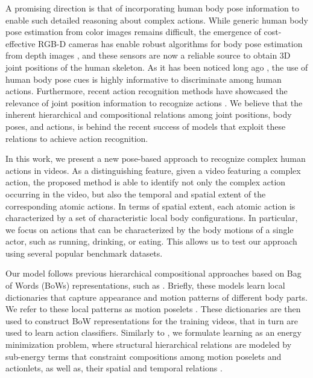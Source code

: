 A promising direction is that of incorporating human body pose information
to enable such detailed reasoning about complex actions.
While generic human body pose estimation from color images remains difficult,
the emergence of cost-effective RGB-D cameras has enable robust
algorithms for body pose estimation from depth images
\cite{Shotton:EtAl:11}, and these sensors are now
a reliable source to obtain 3D joint positions of the human skeleton. 
As it has been noticed long ago \cite{Johansson:1973}, the use of human body
pose cues is highly informative to discriminate among human actions.
Furthermore, recent action recognition methods have
showcased the relevance of joint position information to 
recognize actions \cite{Jhuang2013,Wang2013}. We believe that the 
inherent
hierarchical and compositional relations among joint positions, body poses, and 
actions, is behind the recent success of models that exploit these 
relations to achieve action recognition.

In this work, we present a new pose-based approach to recognize
complex human actions in videos. As a distinguishing feature,
given a video featuring a complex action, the
proposed method is able to identify not only the complex action occurring in the
video, but also the temporal and spatial extent of the corresponding atomic
actions. In terms of spatial extent, each atomic action is characterized by a 
set of characteristic local body configurations. In particular, we focus on 
actions that can be characterized by the
body motions of a single actor, such as running, drinking, or eating. This
allows us to test our approach using several popular benchmark datasets.

Our model follows previous hierarchical compositional approaches based on Bag
of Words (BoWs) representations, such as \cite{Wang2013, 
Lillo2014,Taralova:EtAl:2014,Tao2015}.
Briefly, these models learn local dictionaries that capture
appearance and motion patterns of different body parts. We refer to these local 
patterns as motion poselets \cite{Bourdev:EtAl:2010, Tao2015}. These
dictionaries are then used to construct BoW representations for the training
videos, that in turn are used to learn action classifiers. Similarly to
\cite{Lillo2014, Tao2015}, we formulate learning as an energy minimization
problem, where structural hierarchical relations are modeled by sub-energy
terms that constraint compositions among
motion poselets and actionlets, as well as, their spatial and 
temporal relations
\cite{Lillo2014}.


